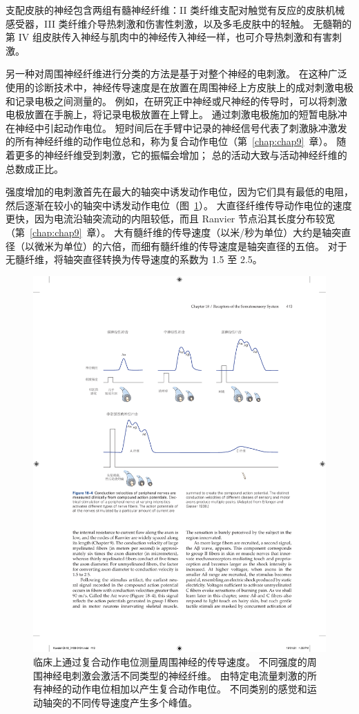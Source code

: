 支配皮肤的神经包含两组有髓神经纤维：II 类纤维支配对触觉有反应的皮肤机械感受器，III 类纤维介导热刺激和伤害性刺激，以及多毛皮肤中的轻触。
无髓鞘的第 IV 组皮肤传入神经与肌肉中的神经传入神经一样，也可介导热刺激和有害刺激。


另一种对周围神经纤维进行分类的方法是基于对整个神经的电刺激。
在这种广泛使用的诊断技术中，神经传导速度是在放置在周围神经上方皮肤上的成对刺激电极和记录电极之间测量的。
例如，在研究正中神经或尺神经的传导时，可以将刺激电极放置在手腕上，将记录电极放置在上臂上。
通过刺激电极施加的短暂电脉冲在神经中引起动作电位。
短时间后在手臂中记录的神经信号代表了刺激脉冲激发的所有神经纤维的动作电位总和，称为复合动作电位（第~\ref{chap:chap9}~章）。
随着更多的神经纤维受到刺激，它的振幅会增加；
总的活动大致与活动神经纤维的总数成正比。


强度增加的电刺激首先在最大的轴突中诱发动作电位，因为它们具有最低的电阻，然后逐渐在较小的轴突中诱发动作电位（图~\ref{fig:18_4}）。
大直径纤维传导动作电位的速度更快，因为电流沿轴突流动的内阻较低，而且 Ranvier 节点沿其长度分布较宽（第~\ref{chap:chap9}~章）。
大有髓纤维的传导速度（以米/秒为单位）大约是轴突直径（以微米为单位）的六倍，而细有髓纤维的传导速度是轴突直径的五倍。
对于无髓纤维，将轴突直径转换为传导速度的系数为 1.5 至 2.5。


\begin{figure}[htbp]
	\centering
	\includegraphics[width=1.0\linewidth]{chap18/fig_18_4}
	\caption{临床上通过复合动作电位测量周围神经的传导速度。
		不同强度的周围神经电刺激会激活不同类型的神经纤维。
		由特定电流量刺激的所有神经的动作电位相加以产生复合动作电位。
		不同类别的感觉和运动轴突的不同传导速度产生多个峰值\cite{erlanger2016electrical}。}
	\label{fig:18_4}
\end{figure}


